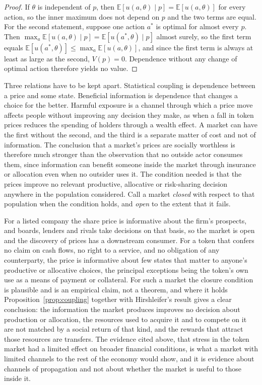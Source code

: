 \documentclass[11pt]{article}
\theoremstyle{remark}
\newcommand{\E}{\mathbb{E}}
\begin{document}
\begin{proof}
If $\theta$ is independent of $p$, then $\E[u(a,\theta)\mid p]=\E[u(a,\theta)]$ for every action, so the inner maximum does not depend on $p$ and the two terms are equal. For the second statement, suppose one action $a^{*}$ is optimal for almost every $p$. Then $\max_a\E[u(a,\theta)\mid p]=\E[u(a^{*},\theta)\mid p]$ almost surely, so the first term equals $\E[u(a^{*},\theta)]\le\max_a\E[u(a,\theta)]$, and since the first term is always at least as large as the second, $V(p)=0$. Dependence without any change of optimal action therefore yields no value.
\end{proof}

Three relations have to be kept apart. Statistical coupling is dependence between a price and some state. Beneficial information is dependence that changes a choice for the better. Harmful exposure is a channel through which a price move affects people without improving any decision they make, as when a fall in token prices reduces the spending of holders through a wealth effect. A market can have the first without the second, and the third is a separate matter of cost and not of information. The conclusion that a market's prices are socially worthless is therefore much stronger than the observation that no outside actor consumes them, since information can benefit someone inside the market through insurance or allocation even when no outsider uses it. The condition needed is that the prices improve no relevant productive, allocative or risk-sharing decision anywhere in the population considered. Call a market \emph{closed} with respect to that population when the condition holds, and \emph{open} to the extent that it fails.

For a listed company the share price is informative about the firm's prospects, and boards, lenders and rivals take decisions on that basis, so the market is open and the discovery of prices has a downstream consumer. For a token that confers no claim on cash flows, no right to a service, and no obligation of any counterparty, the price is informative about few states that matter to anyone's productive or allocative choices, the principal exceptions being the token's own use as a means of payment or collateral. For such a market the closure condition is plausible and is an empirical claim, not a theorem, and where it holds Proposition~\ref{prop:coupling} together with Hirshleifer's result gives a clear conclusion: the information the market produces improves no decision about production or allocation, the resources used to acquire it and to compete on it are not matched by a social return of that kind, and the rewards that attract those resources are transfers. The evidence cited above, that stress in the token market had a limited effect on broader financial conditions, is what a market with limited channels to the rest of the economy would show, and it is evidence about channels of propagation and not about whether the market is useful to those inside it.
\end{document}
